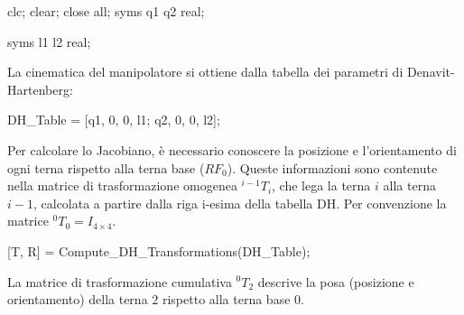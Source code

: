 \documentclass[11pt, a4paper]{article}
\begin{document}
\begin{matlabcode}
clc; clear; close all;
syms q1 q2 real;

syms l1 l2 real;
\end{matlabcode}

\begin{par}
\begin{flushleft}
La cinematica del manipolatore si ottiene dalla tabella dei parametri di Denavit-Hartenberg:
\end{flushleft}
\end{par}

\begin{matlabcode}
DH_Table = [q1, 0, 0, l1;
            q2, 0, 0, l2];
\end{matlabcode}

\begin{par}
\begin{flushleft}
Per calcolare lo Jacobiano, è necessario conoscere la posizione e l'orientamento di ogni terna rispetto alla terna base ($RF_0$). Queste informazioni sono contenute nella matrice di trasformazione omogenea $^{i-1} T_i$, che lega la terna $i$ alla terna $i-1$, calcolata a partire dalla riga i-esima della tabella DH. Per convenzione la matrice $^0 T_0 =I_{4\times 4}$.
\end{flushleft}
\end{par}

\begin{matlabcode}
[T, R] = Compute_DH_Transformations(DH_Table);
\end{matlabcode}

\begin{par}
\begin{flushleft}
La matrice di trasformazione cumulativa $^0 T_2$ descrive la posa (posizione e orientamento) della terna $2$ rispetto alla terna base $0$.
\end{flushleft}
\end{par}
\end{document}
